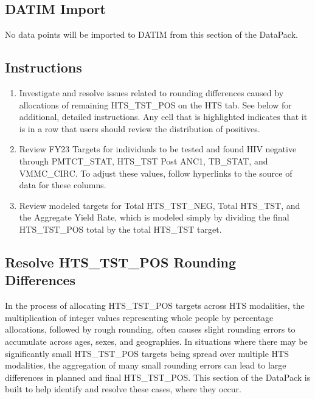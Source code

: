 \documentclass[
  openany]{book}
\begin{document}
\hypertarget{datim-import-45}{%
\subsection{DATIM Import}\label{datim-import-45}}

No data points will be imported to DATIM from this section of the DataPack.

\hypertarget{instructions-45}{%
\subsection{Instructions}\label{instructions-45}}

\begin{enumerate}
\def\labelenumi{\arabic{enumi}.}
\item
  Investigate and resolve issues related to rounding differences caused by allocations of remaining HTS\_TST\_POS on the HTS tab. See below for additional, detailed instructions. Any cell that is highlighted indicates that it is in a row that users should review the distribution of positives.
\item
  Review FY23 Targets for individuals to be tested and found HIV negative through PMTCT\_STAT, HTS\_TST Post ANC1, TB\_STAT, and VMMC\_CIRC. To adjust these values, follow hyperlinks to the source of data for these columns.
\item
  Review modeled targets for Total HTS\_TST\_NEG, Total HTS\_TST, and the Aggregate Yield Rate, which is modeled simply by dividing the final HTS\_TST\_POS total by the total HTS\_TST target.
\end{enumerate}

\hypertarget{resolve-hts_tst_pos-rounding-differences}{%
\subsection{Resolve HTS\_TST\_POS Rounding Differences}\label{resolve-hts_tst_pos-rounding-differences}}

In the process of allocating HTS\_TST\_POS targets across HTS modalities, the multiplication of integer values representing whole people by percentage allocations, followed by rough rounding, often causes slight rounding errors to accumulate across ages, sexes, and geographies. In situations where there may be significantly small HTS\_TST\_POS targets being spread over multiple HTS modalities, the aggregation of many small rounding errors can lead to large differences in planned and final HTS\_TST\_POS. This section of the DataPack is built to help identify and resolve these cases, where they occur.
\end{document}
